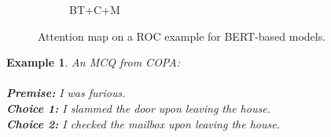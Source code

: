 \documentclass[11pt,a4paper]{article}
\newcommand{\crosssymbol}{{ \XSolidBrush} }
\newcommand{\checksymbol}{{\Checkmark} }
\newtheorem{example}{Example}
\begin{document}
\begin{figure}[th!]
\begin{subfigure}[b]{0.20\textwidth}
\caption{BT+C+M}
\label{fig:roc_cm}
\end{subfigure}
\caption{Attention map on a ROC example for BERT-based models.}
\label{fig:roc_bert}
\end{figure}


\begin{example}\label{ex:copa2}
An MCQ from COPA:\\ \\
\noindent
\textbf{Premise:} I was furious.\\
\textbf{Choice 1:} I slammed the door upon leaving the house.  \checksymbol \\
\textbf{Choice 2:} I checked the mailbox upon leaving the house. \crosssymbol
\end{example}
\end{document}
